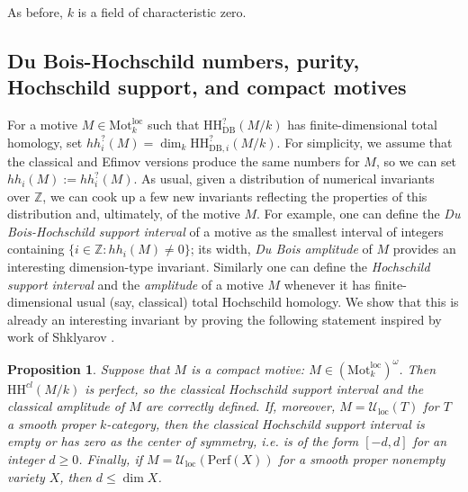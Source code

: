 \documentclass{amsart}
\theoremstyle{plain}
\newtheorem{prop}{Proposition}[section]
\theoremstyle{definition}
\newcommand{\bbZ}{\mathbb{Z}}
\newcommand{\Perf}{\mathrm{Perf}}
\newcommand{\Motloc}{\mathrm{Mot}^{\mathrm{loc}}}
\newcommand{\Uloc}{\mathcal U_{\mathrm{loc}}}
\newcommand{\HH}{\mathrm{HH}}
\newcommand{\DB}{\mathrm{DB}}
\begin{document}
\medskip

As before, $k$ is a field of characteristic zero.

\subsection{Du Bois-Hochschild numbers, purity, Hochschild support, and compact motives}

For a motive $M\in\Motloc_k$ such that $\HH^{?}_{\DB}(M/k)$ has finite-dimensional total homology, set $hh_i^{?}(M)=\dim_k \HH^{?}_{\DB,i}(M/k)$. For simplicity, we assume that the classical and Efimov versions produce the same numbers for $M$, so we can set $hh_i(M):=hh_i^?(M)$. As usual, given a distribution of numerical invariants over $\bbZ$, we can cook up a few new invariants reflecting the properties of this distribution and, ultimately, of the motive $M$. For example, one can define the \emph{Du Bois-Hochschild support interval} of a motive as  the smallest interval of integers containing
$\{i\in\bbZ:hh_i(M)\ne0\}$; its width, \emph{Du Bois amplitude} of $M$ provides an interesting dimension-type invariant. Similarly one can define the \emph{Hochschild support interval} and the \emph{amplitude} of a motive $M$ whenever it has finite-dimensional usual (say, classical) total Hochschild homology. We show that this is already an interesting invariant by proving the following statement inspired by work of Shklyarov \cite[Proposition 3.6 and Theorem 6.2]{Shk08}.

\begin{prop}
Suppose that $M$ is a compact motive: $M\in (\Motloc_k)^\omega$. Then $\HH^{cl}(M/k)$ is perfect, so the classical Hochschild support interval and the classical amplitude of $M$ are correctly defined. If, moreover, $M=\Uloc(T)$ for $T$ a smooth proper $k$-category, then the classical Hochschild support interval is empty or has zero as the center of symmetry, i.e. is of the form $[-d, d]$ for an integer $d\ge 0$. Finally, if $M=\Uloc(\Perf(X))$ for a smooth proper nonempty variety $X$, then $d\le \dim X$.
\end{prop}
\end{document}
